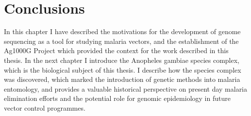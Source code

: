 \documentclass[a4paper,11pt,abstracton,hidelinks]{scrartcl}
\begin{document}
\section{Conclusions}


In this chapter I have described the motivations for the development of genome sequencing as a tool for studying malaria vectors, and the establishment of the Ag1000G Project which provided the context for the work described in this thesis.
%
In the next chapter I introduce the Anopheles gambiae species complex, which is the biological subject of this thesis.
%
I describe how the species complex was discovered, which marked the introduction of genetic methods into malaria entomology, and provides a valuable historical perspective on present day malaria elimination efforts and the potential role for genomic epidemiology in future vector control programmes.


\printbibliography
\end{document}

